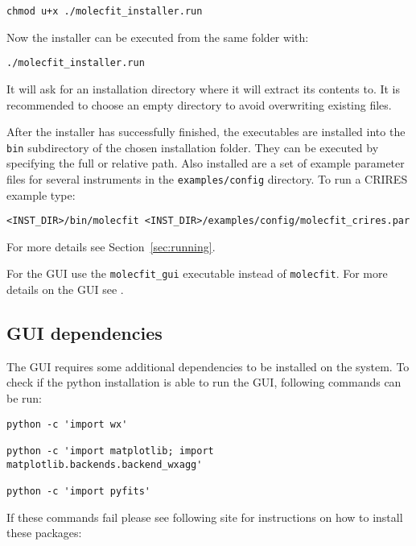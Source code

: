 \begin{verbatim}
chmod u+x ./molecfit_installer.run
\end{verbatim}

Now the installer can be executed from the same folder with:

\begin{verbatim}
./molecfit_installer.run
\end{verbatim}

It will ask for an installation directory where it will extract its
contents to. It is recommended to choose an empty directory to avoid
overwriting existing files.

After the installer has successfully finished, the \mf{} executables
are installed into the \texttt{bin} subdirectory of the chosen installation
folder. They can be executed by specifying the full or relative path.
Also installed are a set of example parameter files for several
instruments in the \texttt{examples/config} directory. To run a CRIRES example
type:

\begin{verbatim}
<INST_DIR>/bin/molecfit <INST_DIR>/examples/config/molecfit_crires.par
\end{verbatim}

For more details see Section~\ref{sec:running}.

For the \ac{GUI} use the \texttt{molecfit\_gui} executable instead of
\texttt{molecfit}.
For more details on the \ac{GUI} see \cite{MFGUI}.

\subsection{\ac{GUI} dependencies}
\label{sec:guidependencies}

The \ac{GUI} requires some additional dependencies to be installed on the system.
To check if the python installation is able to run the \ac{GUI}, following
commands can be run:

\begin{verbatim}
python -c 'import wx'

python -c 'import matplotlib; import matplotlib.backends.backend_wxagg'

python -c 'import pyfits'
\end{verbatim}

If these commands fail please see following site for instructions on how
to install these packages:


